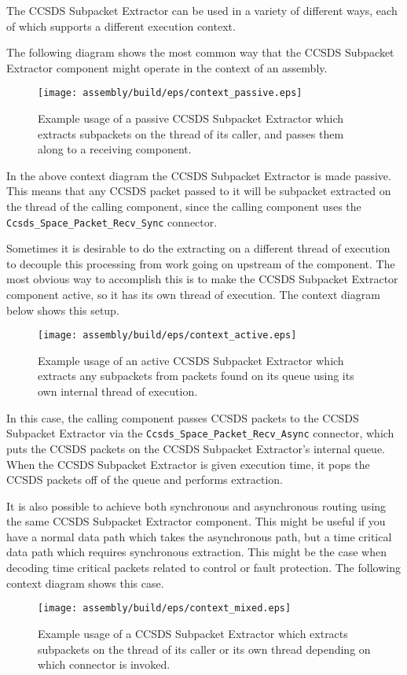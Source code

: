 The CCSDS Subpacket Extractor can be used in a variety of different ways, each of which supports a different execution context.

The following diagram shows the most common way that the CCSDS Subpacket Extractor component might operate in the context of an assembly.

\begin{figure}[H]
  \texttt{[image: assembly/build/eps/context\_passive.eps]}
  \caption{Example usage of a passive CCSDS Subpacket Extractor which extracts subpackets on the thread of its caller, and passes them along to a receiving component.}
\end{figure}

In the above context diagram the CCSDS Subpacket Extractor is made passive. This means that any CCSDS packet passed to it will be subpacket extracted on the thread of the calling component, since the calling component uses the \texttt{Ccsds\_Space\_Packet\_Recv\_Sync} connector.

Sometimes it is desirable to do the extracting on a different thread of execution to decouple this processing from work going on upstream of the component. The most obvious way to accomplish this is to make the CCSDS Subpacket Extractor component active, so it has its own thread of execution. The context diagram below shows this setup.

\begin{figure}[H]
  \texttt{[image: assembly/build/eps/context\_active.eps]}
  \caption{Example usage of an active CCSDS Subpacket Extractor which extracts any subpackets from packets found on its queue using its own internal thread of execution.}
\end{figure}

In this case, the calling component passes CCSDS packets to the CCSDS Subpacket Extractor via the \texttt{Ccsds\_Space\_Packet\_Recv\_Async} connector, which puts the CCSDS packets on the CCSDS Subpacket Extractor's internal queue. When the CCSDS Subpacket Extractor is given execution time, it pops the CCSDS packets off of the queue and performs extraction.

It is also possible to achieve both synchronous and asynchronous routing using the same CCSDS Subpacket Extractor component. This might be useful if you have a normal data path which takes the asynchronous path, but a time critical data path which requires synchronous extraction. This might be the case when decoding time critical packets related to control or fault protection. The following context diagram shows this case.

\begin{figure}[H]
  \texttt{[image: assembly/build/eps/context\_mixed.eps]}
  \caption{Example usage of a CCSDS Subpacket Extractor which extracts subpackets on the thread of its caller or its own thread depending on which connector is invoked.}
\end{figure}
